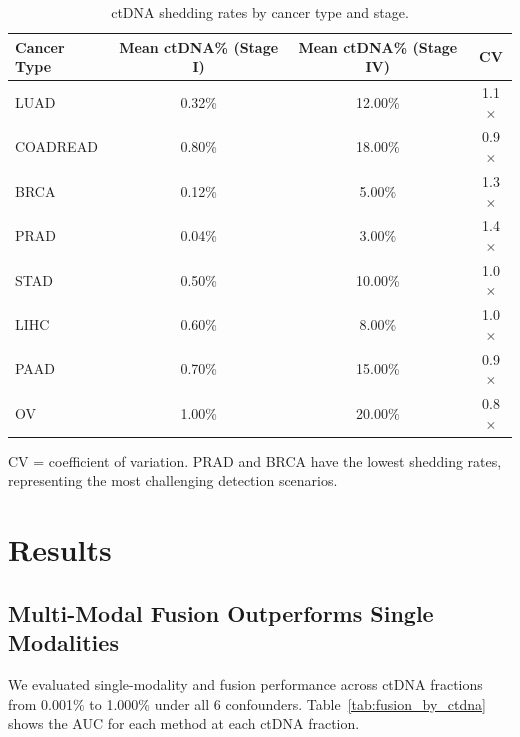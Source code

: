 \documentclass[10pt,a4paper]{article}
\begin{document}
\begin{table}[H]
\centering
\caption{ctDNA shedding rates by cancer type and stage.}
\label{tab:shedding}
\begin{tabular}{l c c c}
\toprule
\textbf{Cancer Type} & \textbf{Mean ctDNA\% (Stage I)} & \textbf{Mean ctDNA\% (Stage IV)} & \textbf{CV} \\
\midrule
LUAD & 0.32\% & 12.00\% & 1.1$\times$ \\
COADREAD & 0.80\% & 18.00\% & 0.9$\times$ \\
BRCA & 0.12\% & 5.00\% & 1.3$\times$ \\
PRAD & 0.04\% & 3.00\% & 1.4$\times$ \\
STAD & 0.50\% & 10.00\% & 1.0$\times$ \\
LIHC & 0.60\% & 8.00\% & 1.0$\times$ \\
PAAD & 0.70\% & 15.00\% & 0.9$\times$ \\
OV & 1.00\% & 20.00\% & 0.8$\times$ \\
\bottomrule
\end{tabular}
\vspace{0.3cm}
\footnotesize{CV = coefficient of variation. PRAD and BRCA have the lowest shedding rates, representing the most challenging detection scenarios.}
\end{table}


\section{Results}

\subsection{Multi-Modal Fusion Outperforms Single Modalities}

We evaluated single-modality and fusion performance across ctDNA fractions from 0.001\% to 1.000\% under all 6 confounders. Table~\ref{tab:fusion_by_ctdna} shows the AUC for each method at each ctDNA fraction.
\end{document}
